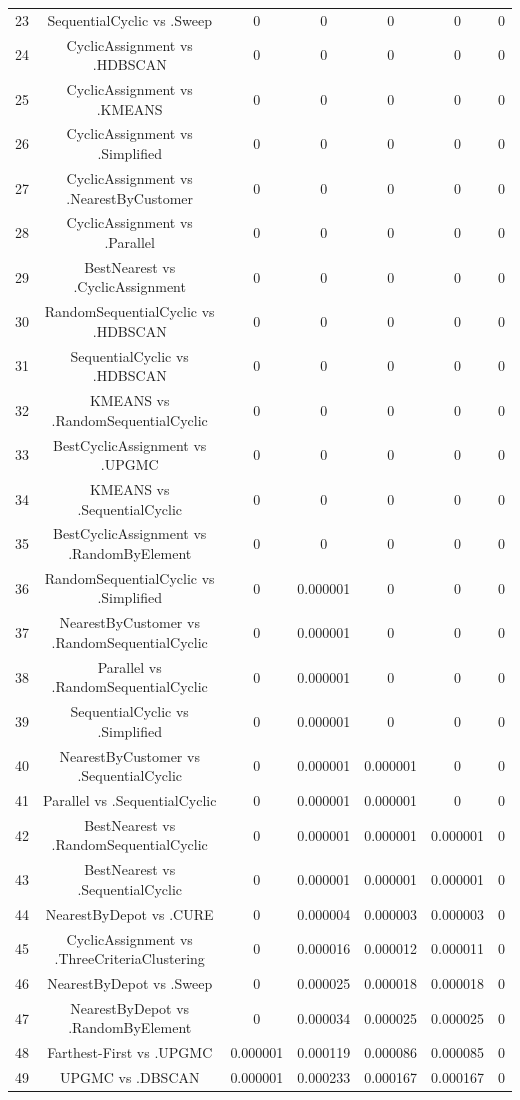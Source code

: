 \documentclass[a4paper,10pt]{article}
\begin{document}
\begin{landscape}
\begin{table}[!htp]
\begin{tabular}{ccccccc}
23&SequentialCyclic vs .Sweep&0&0&0&0&0\\
24&CyclicAssignment vs .HDBSCAN&0&0&0&0&0\\
25&CyclicAssignment vs .KMEANS&0&0&0&0&0\\
26&CyclicAssignment vs .Simplified&0&0&0&0&0\\
27&CyclicAssignment vs .NearestByCustomer&0&0&0&0&0\\
28&CyclicAssignment vs .Parallel&0&0&0&0&0\\
29&BestNearest vs .CyclicAssignment&0&0&0&0&0\\
30&RandomSequentialCyclic vs .HDBSCAN&0&0&0&0&0\\
31&SequentialCyclic vs .HDBSCAN&0&0&0&0&0\\
32&KMEANS vs .RandomSequentialCyclic&0&0&0&0&0\\
33&BestCyclicAssignment vs .UPGMC&0&0&0&0&0\\
34&KMEANS vs .SequentialCyclic&0&0&0&0&0\\
35&BestCyclicAssignment vs .RandomByElement&0&0&0&0&0\\
36&RandomSequentialCyclic vs .Simplified&0&0.000001&0&0&0\\
37&NearestByCustomer vs .RandomSequentialCyclic&0&0.000001&0&0&0\\
38&Parallel vs .RandomSequentialCyclic&0&0.000001&0&0&0\\
39&SequentialCyclic vs .Simplified&0&0.000001&0&0&0\\
40&NearestByCustomer vs .SequentialCyclic&0&0.000001&0.000001&0&0\\
41&Parallel vs .SequentialCyclic&0&0.000001&0.000001&0&0\\
42&BestNearest vs .RandomSequentialCyclic&0&0.000001&0.000001&0.000001&0\\
43&BestNearest vs .SequentialCyclic&0&0.000001&0.000001&0.000001&0\\
44&NearestByDepot vs .CURE&0&0.000004&0.000003&0.000003&0\\
45&CyclicAssignment vs .ThreeCriteriaClustering&0&0.000016&0.000012&0.000011&0\\
46&NearestByDepot vs .Sweep&0&0.000025&0.000018&0.000018&0\\
47&NearestByDepot vs .RandomByElement&0&0.000034&0.000025&0.000025&0\\
48&Farthest-First vs .UPGMC&0.000001&0.000119&0.000086&0.000085&0\\
49&UPGMC vs .DBSCAN&0.000001&0.000233&0.000167&0.000167&0\\

\end{tabular}
\end{table}
\end{landscape}
\end{document}
